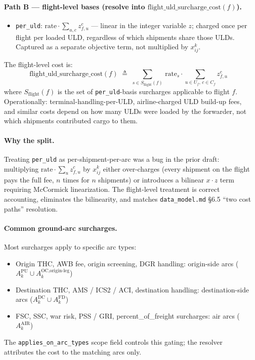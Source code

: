 \documentclass[11pt,a4paper]{article}
\newcommand{\defeq}{\triangleq}
\theoremstyle{definition}
\begin{document}
\paragraph{Path B --- flight-level bases (resolve into $\text{flight\_uld\_surcharge\_cost}(f)$).}
\begin{itemize}[noitemsep]
  \item \texttt{per\_uld}: $\text{rate} \cdot \sum_{u, c} z_{f,u}^c$ --- linear in the
        integer variable $z$; charged once per flight per loaded ULD, regardless of
        which shipments share those ULDs. Captured as a separate objective term, not
        multiplied by $x_{ij}^k$.
\end{itemize}
The flight-level cost is:
\begin{equation}
  \text{flight\_uld\_surcharge\_cost}(f) \;\defeq\;
  \sum_{s \in S_{\text{flight}}(f)}\, \text{rate}_s \cdot \sum_{u \in U_f,\, c \in C_f} z_{f,u}^c
  \label{eq:flight-uld-surcharge}
\end{equation}
where $S_{\text{flight}}(f)$ is the set of \texttt{per\_uld}-basis surcharges
applicable to flight $f$. Operationally: terminal-handling-per-ULD, airline-charged
ULD build-up fees, and similar costs depend on how many ULDs were loaded by the
forwarder, not which shipments contributed cargo to them.

\paragraph{Why the split.}
Treating \texttt{per\_uld} as per-shipment-per-arc was a bug in the prior draft:
multiplying $\text{rate} \cdot \sum_u z_{f,u}^c$ by $x_{ij}^k$ either over-charges
(every shipment on the flight pays the full fee, $n$ times for $n$ shipments) or
introduces a bilinear $x \cdot z$ term requiring McCormick linearization. The
flight-level treatment is correct accounting, eliminates the bilinearity, and
matches \texttt{data\_model.md} \S6.5 ``two cost paths'' resolution.

\paragraph{Common ground-arc surcharges.}
Most surcharges apply to specific arc types:
\begin{itemize}[noitemsep]
  \item Origin THC, AWB fee, origin screening, DGR handling: origin-side arcs ($A_k^{\text{PU}} \cup A_k^{\text{OC,origin-leg}}$)
  \item Destination THC, AMS / ICS2 / ACI, destination handling: destination-side arcs ($A_k^{\text{DC}} \cup A_k^{\text{FD}}$)
  \item FSC, SSC, war risk, PSS / GRI, percent\_of\_freight surcharges: air arcs ($A_k^{\text{AIR}}$)
\end{itemize}
The \texttt{applies\_on\_arc\_types} scope field controls this gating; the resolver
attributes the cost to the matching arcs only.
\end{document}
